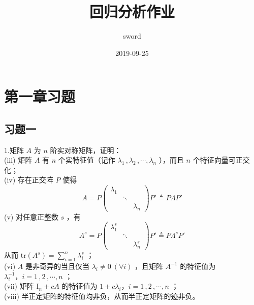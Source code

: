 \documentclass[12pt,hyperref,]{ctexart}
\title{回归分析作业}
\author{sword}
\date{2019-09-25}
\begin{document}
\maketitle

{
\setcounter{tocdepth}{2}
\tableofcontents
}
\newpage

\hypertarget{section}{%
\section{第一章习题}\label{section}}

\hypertarget{section-1}{%
\subsection{习题一}\label{section-1}}

\kaishu

1.矩阵 \(A\) 为 \(n\) 阶实对称矩阵，证明：\\
(iii) 矩阵 \(A\) 有 \(n\) 个实特征值（记作
\(\lambda_1\, ,\lambda_2\, ,\cdots ,\lambda_n\) ），而且 \(n\)
个特征向量可正交化；\\
(iv) 存在正交阵 \(P\) 使得 \begin{equation*}
A = P
\begin{pmatrix}
\lambda_1 & & \\
 & \ddots & \\
 & & \lambda_n
\end{pmatrix} P' \triangleq P\Lambda P'
\end{equation*} (v) 对任意正整数 \(s\) ，有 \begin{equation*}
A^s = P
\begin{pmatrix}
\lambda_1^s & & \\
 & \ddots & \\
 & & \lambda_n^s
\end{pmatrix} P' \triangleq P\Lambda^s P'
\end{equation*}从而 \(\mathrm{tr}(A^s)=\sum_{i=1}^{n}\lambda_i^s\) ；\\
(vi) \(A\) 是非奇异的当且仅当 \(\lambda_i \ne 0\ (\forall i)\) ，且矩阵
\(A^{-1}\) 的特征值为 \(\lambda_i^{-1}\text{，}i=1\, ,2\, ,\cdots ,n\)
；\\
(vii) 矩阵 \(\mathrm{I}_n+cA\) 的特征值为
\(1+c\lambda_i\text{，}i=1\, ,2\, ,\cdots ,n\) ；\\
(viii) 半正定矩阵的特征值均非负，从而半正定矩阵的迹非负。\\
\vspace{1em}

\heiti
\end{document}
